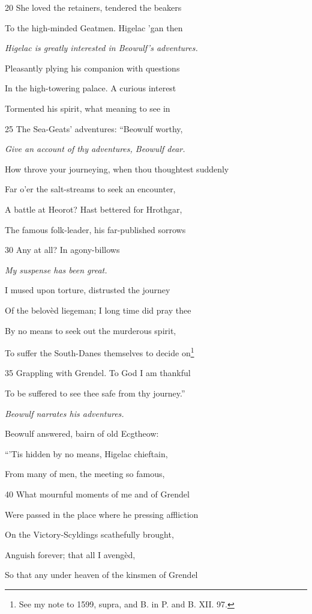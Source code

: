20
She loved the retainers, tendered the beakers

To the high-minded Geatmen. Higelac ’gan then

\emph{Higelac is greatly
interested in Beowulf’s
adventures.}

Pleasantly plying his companion with questions

In the high-towering palace. A curious interest

Tormented his spirit, what meaning to see in

25
The Sea-Geats’ adventures: “Beowulf worthy,

\emph{Give an account of
thy adventures,
Beowulf dear.}

How throve your journeying, when thou thoughtest suddenly

Far o’er the salt-streams to seek an encounter,

A battle at Heorot? Hast bettered for Hrothgar,

The famous folk-leader, his far-published sorrows

30
Any at all? In agony-billows

\emph{My suspense has
been great.}

I mused upon torture, distrusted the journey

Of the belovèd liegeman; I long time did pray thee

By no means to seek out the murderous spirit,

To suffer the South-Danes themselves to decide on\footnote{See my note to 1599, supra, and B. in P. and B. XII. 97.}

35
Grappling with Grendel. To God I am thankful

To be suffered to see thee safe from thy journey.”

\emph{Beowulf narrates
his adventures.}

Beowulf answered, bairn of old Ecgtheow:

“’Tis hidden by no means, Higelac chieftain,

From many of men, the meeting so famous,

40
What mournful moments of me and of Grendel

Were passed in the place where he pressing affliction

On the Victory-Scyldings scathefully brought,

Anguish forever; that all I avengèd,

So that any under heaven of the kinsmen of Grendel

